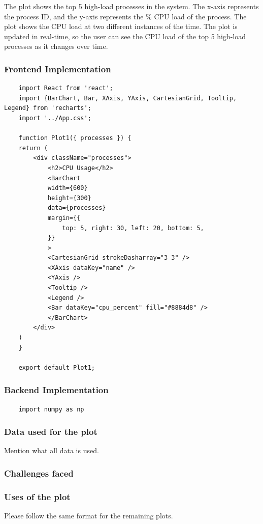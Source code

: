 \documentclass[12pt]{article}
\begin{document}
The plot shows the top 5 high-load processes in the system. The x-axis represents the process ID, and the y-axis represents the \% CPU load of the process. The plot shows the CPU load at two different instances of the time. The plot is updated in real-time, so the user can see the CPU load of the top 5 high-load processes as it changes over time.

\subsubsection{Frontend Implementation}
\begin{verbatim}
    import React from 'react';
    import {BarChart, Bar, XAxis, YAxis, CartesianGrid, Tooltip, Legend} from 'recharts';
    import '../App.css';

    function Plot1({ processes }) {
    return (
        <div className="processes">
            <h2>CPU Usage</h2>
            <BarChart
            width={600}
            height={300}
            data={processes}
            margin={{
                top: 5, right: 30, left: 20, bottom: 5,
            }}
            >
            <CartesianGrid strokeDasharray="3 3" />
            <XAxis dataKey="name" />
            <YAxis />
            <Tooltip />
            <Legend />
            <Bar dataKey="cpu_percent" fill="#8884d8" />
            </BarChart>
        </div>
    )
    }

    export default Plot1;
\end{verbatim}
\subsubsection{Backend Implementation}
\begin{verbatim}
    import numpy as np
\end{verbatim}
\subsubsection{Data used for the plot}
Mention what all data is used.
\subsubsection{Challenges faced}
\subsubsection{Uses of the plot}

\bigskip
Please follow the same format for the remaining plots.
\end{document}
